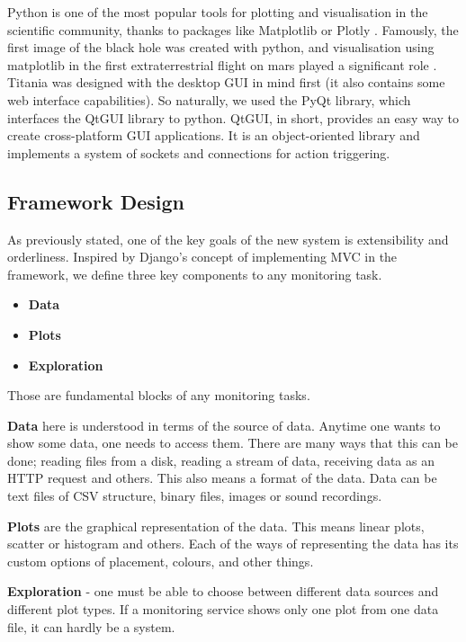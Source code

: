 Python is one of the most popular tools for plotting and visualisation in the scientific community, thanks to packages like Matplotlib\cite{Hunter:2007} or Plotly \cite{plotly}.
Famously, the first image of the black hole \cite{blackhole} was created with python, and visualisation using matplotlib in the first extraterrestrial flight on mars played a significant role \cite{ingenuity}.
Titania was designed with the desktop GUI in mind first (it also contains some web interface capabilities).
So naturally, we used the PyQt library, which interfaces the QtGUI library to python.
QtGUI, in short, provides an easy way to create cross-platform GUI applications.
It is an object-oriented library and implements a system of sockets and connections for action triggering.

\subsection{Framework Design}

As previously stated, one of the key goals of the new system is extensibility and orderliness.
Inspired by Django's concept of implementing MVC in the framework, we define three key components to any monitoring task.

\begin{itemize}
  \item \textbf{Data}
  \item \textbf{Plots}
  \item \textbf{Exploration}
\end{itemize}

Those are fundamental blocks of any monitoring tasks.


\textbf{Data} here is understood in terms of the source of data. Anytime one wants to show some data, one needs to access them.
There are many ways that this can be done; reading files from a disk, reading a stream of data, receiving data as an HTTP request and others.
This also means a format of the data. Data can be text files of CSV structure, binary files, images or sound recordings.

\textbf{Plots} are the graphical representation of the data. This means linear plots, scatter or histogram and others. Each of the ways of representing the data has its custom options of placement, colours, and other things.

\textbf{Exploration} - one must be able to choose between different data sources and different plot types. If a monitoring service shows only one plot from one data file, it can hardly be a system.



